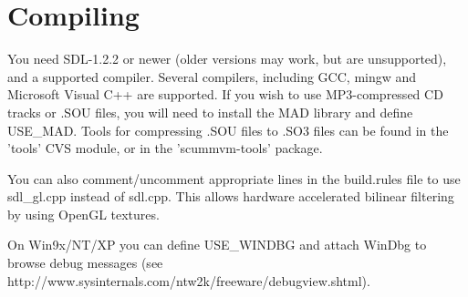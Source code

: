 

\section{Compiling}

You need SDL-1.2.2 or newer (older versions may work, but are unsupported), and
a supported compiler. Several compilers, including GCC, mingw and Microsoft
Visual C++ are supported. If you wish to use MP3-compressed CD tracks or
.SOU files, you will need to install the MAD library and define
USE\_MAD. Tools for compressing .SOU files to .SO3 files can be
found in the 'tools' CVS module, or in the 'scummvm-tools' package.

You can also comment/uncomment appropriate lines in the build.rules file to
use sdl\_gl.cpp instead of sdl.cpp. This allows hardware accelerated bilinear
filtering by using OpenGL textures.

On Win9x/NT/XP you can define USE\_WINDBG and attach WinDbg to browse debug 
messages (see http://www.sysinternals.com/ntw2k/freeware/debugview.shtml).

